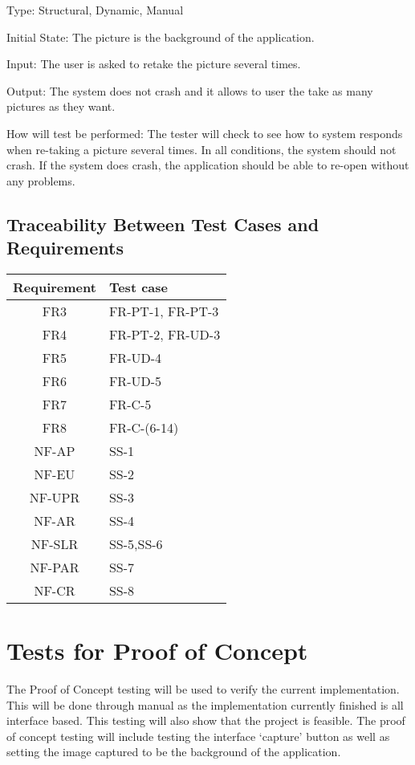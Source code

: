 \documentclass[12pt, titlepage]{article}
\begin{document}
\begin{enumerate}
Type: Structural, Dynamic, Manual

Initial State: The picture is the background of the application.

Input: The user is asked to retake the picture several times.

Output: The system does not crash and it allows to user the take as many pictures as they want.

How will test be performed: The tester will check to see how to system responds when re-taking a picture several times. In all conditions, the system should not crash. If the system does crash, the application should be able to re-open without any problems.


\end{enumerate}


\subsection{Traceability Between Test Cases and Requirements}
\begin{table}[H]
     
	\label{Table}
	\begin{tabular}{|c|L|}
		\hline
		\hline
		Requirement & Test case\\
		\hline
		FR3 & FR-PT-1, FR-PT-3\\
		\hline
		FR4 & FR-PT-2, FR-UD-3\\ 
		\hline 
		FR5 & FR-UD-4\\
		\hline
	    FR6 & FR-UD-5\\
	    \hline
	    FR7 & FR-C-5\\
		\hline
		FR8 & FR-C-(6-14)\\
		\hline
		NF-AP & SS-1\\
		\hline
		NF-EU & SS-2\\
		\hline
		NF-UPR & SS-3\\
		\hline
		NF-AR & SS-4\\
		\hline
		NF-SLR & SS-5,SS-6\\
		\hline 
		NF-PAR & SS-7\\
		\hline
		NF-CR & SS-8\\
		\hline
		\hline
		
	\end{tabular}
\end{table}

\section{Tests for Proof of Concept}
The Proof of Concept testing will be used to verify the current implementation. This will be done through manual as the implementation currently finished is all interface based. This testing will also show that the project is feasible. The proof of concept testing will include testing the interface ‘capture’ button as well as setting the image captured to be the background of the application.
\end{document}
